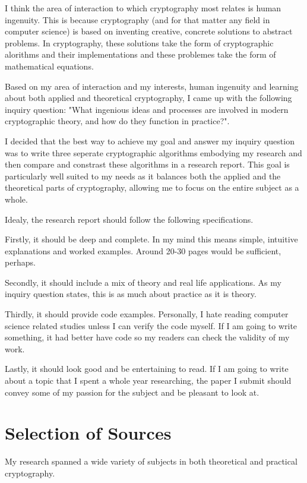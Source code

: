 \documentclass[12pt, a4paper, draft]{report}
\begin{document}
I think the area of interaction to which cryptography most relates is
human ingenuity. This is because cryptography (and for that matter any
field in computer science) is based on inventing creative, concrete
solutions to abstract problems. In cryptography, these solutions
take the form of cryptographic alorithms and their implementations
and these problemes take the form of mathematical equations.

Based on my area of interaction and my interests, human ingenuity and
learning about both applied and theoretical cryptography, I came up with the
following inquiry question: "What ingenious ideas and processes are involved
in modern cryptographic theory, and how do they function in practice?".

I decided that the best way to achieve my goal and answer my inquiry
question was to write three seperate cryptographic algorithms embodying
my research and then compare and constrast these algorithms in a research
report. This goal is particularly well suited to my needs as it balances
both the applied and the theoretical parts of cryptography, allowing me to
focus on the entire subject as a whole.

Idealy, the research report should follow the following specifications.

Firstly, it should be deep and complete. In my mind this means simple,
intuitive explanations and worked examples. Around 20-30 pages would be
sufficient, perhaps.

Secondly, it should include a mix of theory and real life applications.
As my inquiry question states, this is as much about practice as it is
theory.

Thirdly, it should provide code examples. Personally, I hate reading
computer science related studies unless I can verify the code myself.
If I am going to write something, it had better have code so my
readers can check the validity of my work.

Lastly, it should look good and be entertaining to read. If I am
going to write about a topic that I spent a whole year researching,
the paper I submit should convey some of my passion for the subject
and be pleasant to look at.

\section{Selection of Sources}

My research spanned a wide variety of subjects in both theoretical and
practical cryptography.
\end{document}
